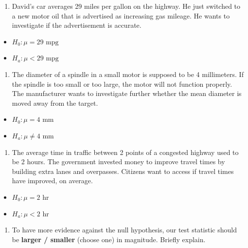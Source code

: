 \documentclass[
  openany]{book}
\providecommand{\tightlist}{%
  \setlength{\itemsep}{0pt}\setlength{\parskip}{0pt}}
\begin{document}
\begin{enumerate}
\def\labelenumi{\alph{enumi}.}
\tightlist
\item
  David's car averages 29 miles per gallon on the highway. He just switched to a new motor oil that is advertised as increasing gas mileage. He wants to investigate if the advertisement is accurate.
\end{enumerate}

\begin{itemize}
\tightlist
\item
  \(H_0: \mu = 29 \text{ mpg}\)
\item
  \(H_a: \mu < 29 \text{ mpg}\)
\end{itemize}

\begin{enumerate}
\def\labelenumi{\alph{enumi}.}
\setcounter{enumi}{1}
\tightlist
\item
  The diameter of a spindle in a small motor is supposed to be 4 millimeters. If the spindle is too small or too large, the motor will not function properly. The manufacturer wants to investigate further whether the mean diameter is moved away from the target.
\end{enumerate}

\begin{itemize}
\tightlist
\item
  \(H_0: \mu = 4 \text{ mm}\)
\item
  \(H_a: \mu \ne 4 \text{ mm}\)
\end{itemize}

\begin{enumerate}
\def\labelenumi{\alph{enumi}.}
\setcounter{enumi}{2}
\tightlist
\item
  The average time in traffic between 2 points of a congested highway used to be 2 hours. The government invested money to improve travel times by building extra lanes and overpasses. Citizens want to access if travel times have improved, on average.
\end{enumerate}

\begin{itemize}
\tightlist
\item
  \(H_0: \mu = 2 \text{ hr}\)
\item
  \(H_a: \mu < 2 \text{ hr}\)
\end{itemize}

\begin{enumerate}
\def\labelenumi{\arabic{enumi}.}
\setcounter{enumi}{10}
\tightlist
\item
  To have more evidence against the null hypothesis, our test statistic should be \textbf{larger / smaller} (choose one) in magnitude. Briefly explain.
\end{enumerate}
\end{document}
